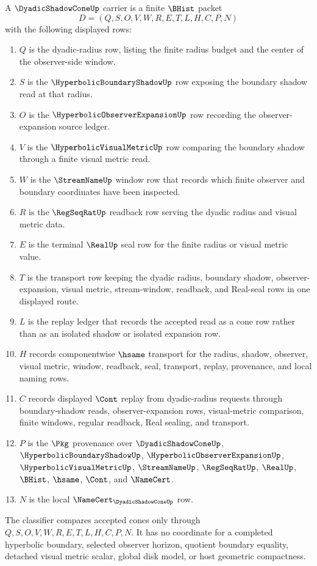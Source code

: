 \begin{definition}
\label{def:dyadic-shadow-cone-carrier}
A $\DyadicShadowConeUp$ carrier is a finite $\BHist$ packet
$$
D=(Q,S,O,V,W,R,E,T,L,H,C,P,N)
$$
with the following displayed rows:
\begin{enumerate}
\item $Q$ is the dyadic-radius row, listing the finite radius budget and the center of the observer-side window.
\item $S$ is the $\HyperbolicBoundaryShadowUp$ row exposing the boundary shadow read at that radius.
\item $O$ is the $\HyperbolicObserverExpansionUp$ row recording the observer-expansion source ledger.
\item $V$ is the $\HyperbolicVisualMetricUp$ row comparing the boundary shadow through a finite visual metric read.
\item $W$ is the $\StreamNameUp$ window row that records which finite observer and boundary coordinates have been inspected.
\item $R$ is the $\RegSeqRatUp$ readback row serving the dyadic radius and visual metric data.
\item $E$ is the terminal $\RealUp$ seal row for the finite radius or visual metric value.
\item $T$ is the transport row keeping the dyadic radius, boundary shadow, observer-expansion, visual metric, stream-window, readback, and Real-seal rows in one displayed route.
\item $L$ is the replay ledger that records the accepted read as a cone row rather than as an isolated shadow or isolated expansion row.
\item $H$ records componentwise $\hsame$ transport for the radius, shadow, observer, visual metric, window, readback, seal, transport, replay, provenance, and local naming rows.
\item $C$ records displayed $\Cont$ replay from dyadic-radius requests through boundary-shadow reads, observer-expansion rows, visual-metric comparison, finite windows, regular readback, Real sealing, and transport.
\item $P$ is the $\Pkg$ provenance over $\DyadicShadowConeUp$, $\HyperbolicBoundaryShadowUp$, $\HyperbolicObserverExpansionUp$, $\HyperbolicVisualMetricUp$, $\StreamNameUp$, $\RegSeqRatUp$, $\RealUp$, $\BHist$, $\hsame$, $\Cont$, and $\NameCert$.
\item $N$ is the local $\NameCert_{\DyadicShadowConeUp}$ row.
\end{enumerate}
The classifier compares accepted cones only through $Q,S,O,V,W,R,E,T,L,H,C,P,N$. It has no coordinate for a completed hyperbolic boundary, selected observer horizon, quotient boundary equality, detached visual metric scalar, global disk model, or host geometric compactness.
\end{definition}

